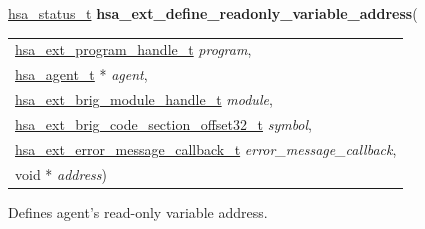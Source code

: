 \documentclass[final]{book}
\newcommand{\hsaarg}[1]{\textit{#1}}
\begin{document}
\noindent\begin{tcolorbox}[breakable,nobeforeafter,colframe=white,colback=lightgray,left=0mm]
\hyperlink{group__status_1gad755322e7ff95456520e8abdbe90d225}{hsa_status_t} \hypertarget{group__HsailLinkerServiceLayer_1gad44c3caee0b66833b6a10a9d778ecc4c}{\textbf{hsa_ext_define_readonly_variable_address}}(
\vspace{-3.5mm}\begin{longtable}{@{}p{\textwidth}}
\hspace{1.7em}\hyperlink{group__HsailLinkerServiceLayer_1gaea8d90863414407ddba7e318db7412f9}{hsa_ext_program_handle_t} \hsaarg{program},\\
\hspace{1.7em}\hyperlink{group__topology_1gab8db3fb886332a24acac08ec361e1d86}{hsa_agent_t} * \hsaarg{agent},\\
\hspace{1.7em}\hyperlink{group__FinalizerCoreApi_1ga0216996f5341a8591ecf9e0f6fd1b7e5}{hsa_ext_brig_module_handle_t} \hsaarg{module},\\
\hspace{1.7em}\hyperlink{group__FinalizerCoreApi_1ga494b8ac14a8c10af95b83b51a8a4ad7f}{hsa_ext_brig_code_section_offset32_t} \hsaarg{symbol},\\
\hspace{1.7em}\hyperlink{group__FinalizerCoreApi_1gace3d3971c5289675c4f88ce0045db41f}{hsa_ext_error_message_callback_t} \hsaarg{error_message_callback},\\
\hspace{1.7em}void * \hsaarg{address})\end{longtable}

\end{tcolorbox}
Defines agent's read-only variable address.
\end{document}
